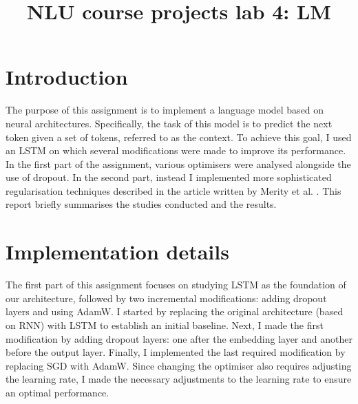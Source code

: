 \documentclass[a4paper]{article}
\title{NLU course projects lab 4: LM}
\begin{document}
\maketitle

\section{Introduction}
The purpose of this assignment is to implement a language model based on neural architectures.
Specifically, the task of this model is to predict the next token given a set of tokens, referred to as the context.
To achieve this goal, I used an LSTM on which several modifications were made to improve its performance. 
In the first part of the assignment, various optimisers were analysed alongside the use of dropout. In the second part, instead I implemented more sophisticated regularisation techniques described in the article written by Merity et al. \cite{merity2017regularizing}.
This report briefly summarises the studies conducted and the results.

\section{Implementation details}
The first part of this assignment focuses on studying LSTM as the foundation of our architecture, followed by two incremental modifications: adding dropout layers and using AdamW.
I started by replacing the original architecture (based on RNN) with LSTM to establish an initial baseline.
Next, I made the first modification by adding dropout layers: one after the embedding layer and another before the output layer.
Finally, I implemented the last required modification by replacing SGD with AdamW. Since changing the optimiser also requires adjusting the learning rate, I made the necessary adjustments to the learning rate to ensure an optimal performance.
\end{document}
